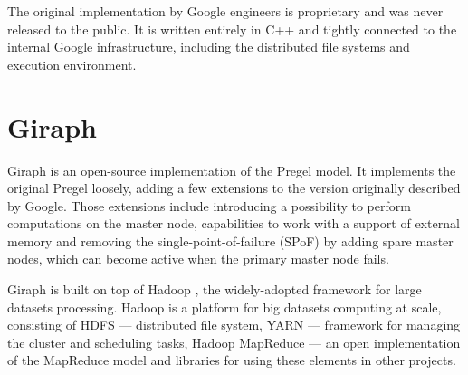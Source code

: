 \documentclass{pracamgr}
\theoremstyle{plain}
\theoremstyle{definition}
\theoremstyle{remark}
\begin{document}
The original implementation by Google engineers is proprietary and was never released to the public. It is written entirely in C++ and tightly connected to the internal Google infrastructure, including the distributed file systems and execution environment.

\section{Giraph}

Giraph\cite{giraph} is an open-source implementation of the Pregel model. It implements the original Pregel loosely, adding a few extensions to the version originally described by Google. Those extensions include introducing a possibility to perform computations on the master node, capabilities to work with a support of external memory and removing the single-point-of-failure (SPoF) by adding spare master nodes, which can become active when the primary master node fails.

Giraph is built on top of Hadoop \cite{hadoop}, the widely-adopted framework for large datasets processing. Hadoop is a platform for big datasets computing at scale, consisting of HDFS --- distributed file system, YARN --- framework for managing the cluster and scheduling tasks, Hadoop MapReduce --- an open implementation of the MapReduce model and libraries for using these elements in other projects.
\end{document}
